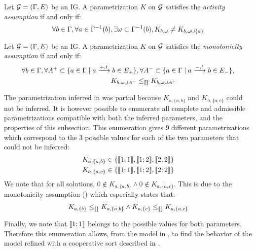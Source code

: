 \begin{property}
\label{pro:param_enum_activity}
Let $\mathcal{G} = (\Gamma, E)$ be an IG. A parametrization $K$ on $\mathcal{G}$ satisfies the \emph{activity assumption} if and only if:
\begin{align*}
  \forall b \in \Gamma, \forall a \in \Gamma^{-1}(b), \exists \omega \subset \Gamma^{-1}(b), K_{b,\omega} \neq K_{b,\omega \cup \{ a \}}
\end{align*}
\end{property}

\begin{property}
\label{pro:param_enum_monotonicity}
Let $\mathcal{G} = (\Gamma, E)$ be an IG. A parametrization $K$ on $\mathcal{G}$ satisfies the \emph{monotonicity assumption} if and only if:
\begin{align*}
  \forall b \in \Gamma,
  \forall A^+ \subset \{ a \in \Gamma \mid a \xrightarrow{+, t} b \in E_+ \}&,
  \forall A^- \subset \{ a \in \Gamma \mid a \xrightarrow{-, t} b \in E_- \},\\
  K_{b,\omega \cup A^-} & \leq_{\llbracket\rrbracket} K_{b,\omega \cup A^+}
\end{align*}
\end{property}

\begin{example}\label{ex:enum-param-runningPH-1}
The parametrization inferred in  was partial because $K_{a,\{a,b\}}$ and $K_{a,\{a,c\}}$ could not be inferred.
It is however possible to enumerate all complete and admissible parametrizations
compatible with both the inferred parameters, and the properties of this subsection.
This enumeration gives 9 different parametrizations which correspond to the 3 possible values
for each of the two parameters that could not be inferred:
\begin{align*}
  K_{a,\{a,b\}} &\in \{ \llbracket 1 ; 1 \rrbracket, \llbracket 1 ; 2 \rrbracket, \llbracket 2 ; 2 \rrbracket \} \\
  K_{a,\{a,c\}} &\in \{ \llbracket 1 ; 1 \rrbracket, \llbracket 1 ; 2 \rrbracket, \llbracket 2 ; 2 \rrbracket \}
\end{align*}
We note that for all solutions, $0 \notin K_{a,\{a,b\}} \wedge 0 \notin K_{a,\{a,c\}}$.
This is due to the monotonicity assumption () which especially states that:
\begin{align*}
  K_{a,\{b\}} \leq_{\llbracket\rrbracket} K_{a,\{a,b\}} \wedge
  K_{a,\{c\}} \leq_{\llbracket\rrbracket} K_{a,\{a,c\}}
\end{align*}

Finally, we note that $\llbracket 1 ; 1 \rrbracket$ belongs to the possible values for both parameters.
Therefore this enumeration allows, from the model in ,
to find the behavior of the model refined with a cooperative sort described in .
\end{example}

